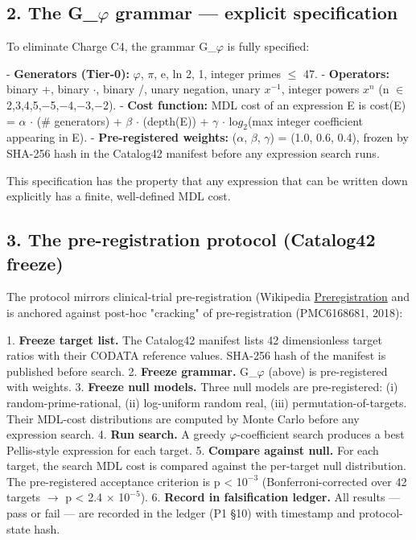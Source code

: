 \subsection{2. The G\_$\varphi$ grammar --- explicit specification}

To eliminate Charge C4, the grammar G\_$\varphi$ is fully specified:

- \textbf{Generators (Tier-0):} $\varphi$, $\pi$, e, ln 2, 1, integer primes $\leq$ 47.
- \textbf{Operators:} binary +, binary $\cdot$, binary /, unary negation, unary $x^{-1}$, integer powers $x^n$ (n $\in$ {2,3,4,5,$-$5,$-$4,$-$3,$-$2}).
- \textbf{Cost function:} MDL cost of an expression E is
  cost(E) = $\alpha$ $\cdot$ (\# generators) + $\beta$ $\cdot$ (depth(E)) + $\gamma$ $\cdot$ lo$g_{2}$(max integer coefficient appearing in E).
- \textbf{Pre-registered weights:} ($\alpha$, $\beta$, $\gamma$) = (1.0, 0.6, 0.4), frozen by SHA-256 hash in the Catalog42 manifest before any expression search runs.

This specification has the property that any expression that can be written down explicitly has a finite, well-defined MDL cost.

\subsection{3. The pre-registration protocol (Catalog42 freeze)}

The protocol mirrors clinical-trial pre-registration (Wikipedia \href{https://en.wikipedia.org/wiki/Preregistration\_\%28science\%29}{Preregistration} and is anchored against post-hoc "cracking" of pre-registration (PMC6168681, 2018):

1. \textbf{Freeze target list.} The Catalog42 manifest lists 42 dimensionless target ratios with their CODATA reference values. SHA-256 hash of the manifest is published before search.
2. \textbf{Freeze grammar.} G\_$\varphi$ (above) is pre-registered with weights.
3. \textbf{Freeze null models.} Three null models are pre-registered: (i) random-prime-rational, (ii) log-uniform random real, (iii) permutation-of-targets. Their MDL-cost distributions are computed by Monte Carlo before any expression search.
4. \textbf{Run search.} A greedy $\varphi$-coefficient search produces a best Pellis-style expression for each target.
5. \textbf{Compare against null.} For each target, the search MDL cost is compared against the per-target null distribution. The pre-registered acceptance criterion is p < 1$0^{-3}$ (Bonferroni-corrected over 42 targets $\rightarrow$ p < 2.4 $\times$ 1$0^{-5}$).
6. \textbf{Record in falsification ledger.} All results --- pass or fail --- are recorded in the ledger (P1 §10) with timestamp and protocol-state hash.

